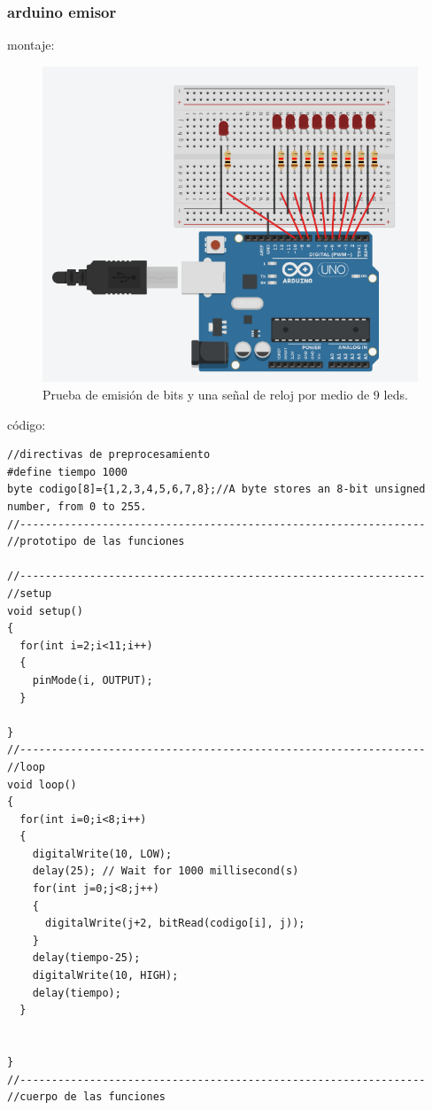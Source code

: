 \documentclass{article}
\begin{document}
\subsubsection{arduino emisor}\label{intento1}

montaje:
\begin{figure}[h]
\includegraphics[scale=0.8]{emisor1.png}
\centering
\caption{Prueba de emisión de bits y una señal de reloj por medio de 9 leds.}
\label{fig:emisor1}
\end{figure}

código:
\begin{lstlisting}[style=myArduino]//directivas de preprocesamiento
#define tiempo 1000
byte codigo[8]={1,2,3,4,5,6,7,8};//A byte stores an 8-bit unsigned number, from 0 to 255.
//----------------------------------------------------------------
//prototipo de las funciones

//----------------------------------------------------------------
//setup
void setup()
{
  for(int i=2;i<11;i++)
  {
    pinMode(i, OUTPUT);
  }
  
}
//----------------------------------------------------------------
//loop
void loop()
{
  for(int i=0;i<8;i++)
  {
  	digitalWrite(10, LOW);
  	delay(25); // Wait for 1000 millisecond(s)
    for(int j=0;j<8;j++)
    {
      digitalWrite(j+2, bitRead(codigo[i], j));
    }
    delay(tiempo-25);
    digitalWrite(10, HIGH);
    delay(tiempo);
  }
  
  
}
//----------------------------------------------------------------
//cuerpo de las funciones
\end{lstlisting}
\end{document}
